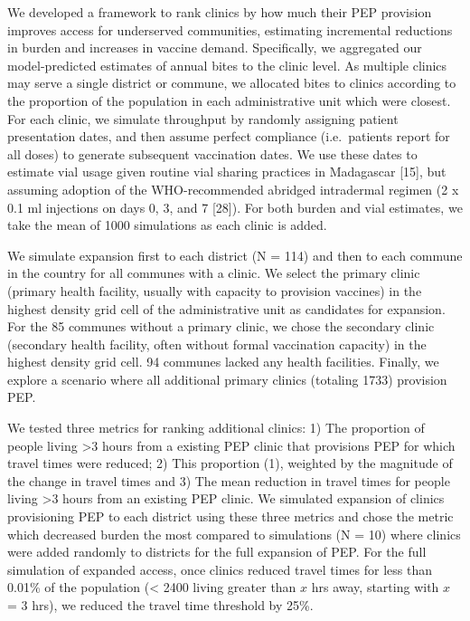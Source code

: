 \documentclass[
]{book}
\begin{document}
We developed a framework to rank clinics by how much their PEP provision
improves access for underserved communities, estimating incremental
reductions in burden and increases in vaccine demand. Specifically, we
aggregated our model-predicted estimates of annual bites to the clinic
level. As multiple clinics may serve a single district or commune, we
allocated bites to clinics according to the proportion of the population
in each administrative unit which were closest. For each clinic, we
simulate throughput by randomly assigning patient presentation dates,
and then assume perfect compliance (i.e.~patients report for all doses)
to generate subsequent vaccination dates. We use these dates to estimate
vial usage given routine vial sharing practices in Madagascar {[}15{]},
but assuming adoption of the WHO-recommended abridged intradermal
regimen (2 x 0.1 ml injections on days 0, 3, and 7 {[}28{]}). For both
burden and vial estimates, we take the mean of 1000 simulations as each
clinic is added.

We simulate expansion first to each district (N = 114) and then to each
commune in the country for all communes with a clinic. We select the
primary clinic (primary health facility, usually with capacity to
provision vaccines) in the highest density grid cell of the
administrative unit as candidates for expansion. For the 85 communes
without a primary clinic, we chose the secondary clinic (secondary
health facility, often without formal vaccination capacity) in the
highest density grid cell. 94 communes lacked any health facilities.
Finally, we explore a scenario where all additional primary clinics
(totaling 1733) provision PEP.

We tested three metrics for ranking additional clinics: 1) The
proportion of people living \textgreater3 hours from a existing PEP clinic that
provisions PEP for which travel times were reduced; 2) This proportion
(1), weighted by the magnitude of the change in travel times and 3) The
mean reduction in travel times for people living \textgreater3 hours from an
existing PEP clinic. We simulated expansion of clinics provisioning PEP
to each district using these three metrics and chose the metric which
decreased burden the most compared to simulations (N = 10) where clinics
were added randomly to districts for the full expansion of PEP. For the
full simulation of expanded access, once clinics reduced travel times
for less than 0.01\% of the population (\textless{} 2400 living greater than \(x\)
hrs away, starting with \(x\) = 3 hrs), we reduced the travel time
threshold by 25\%.
\end{document}
